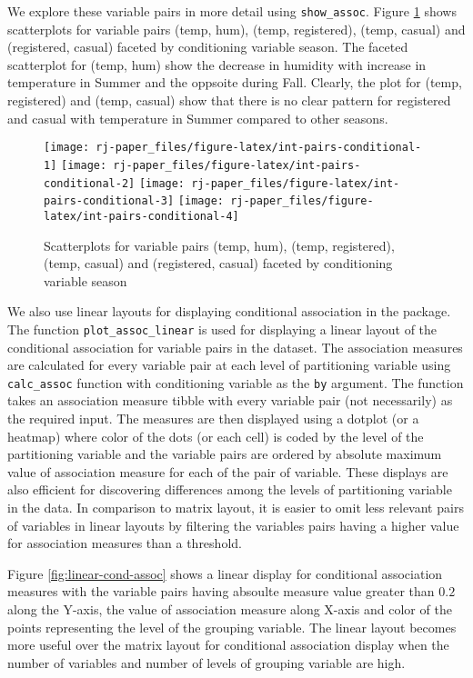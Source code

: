 We explore these variable pairs in more detail using \texttt{show\_assoc}. Figure \ref{fig:int-pairs-conditional} shows scatterplots for variable pairs (temp, hum), (temp, registered), (temp, casual) and (registered, casual) faceted by conditioning variable season. The faceted scatterplot for (temp, hum) show the decrease in humidity with increase in temperature in Summer and the oppsoite during Fall. Clearly, the plot for (temp, registered) and (temp, casual) show that there is no clear pattern for registered and casual with temperature in Summer compared to other seasons.

\begin{figure}
\texttt{[image: rj-paper\_files/figure-latex/int-pairs-conditional-1]} \texttt{[image: rj-paper\_files/figure-latex/int-pairs-conditional-2]} \texttt{[image: rj-paper\_files/figure-latex/int-pairs-conditional-3]} \texttt{[image: rj-paper\_files/figure-latex/int-pairs-conditional-4]} \caption{Scatterplots for variable pairs (temp, hum), (temp, registered), (temp, casual) and (registered, casual) faceted by conditioning variable season}\label{fig:int-pairs-conditional}
\end{figure}

We also use linear layouts for displaying conditional association in the package. The function \texttt{plot\_assoc\_linear} is used for displaying a linear layout of the conditional association for variable pairs in the dataset. The association measures are calculated for every variable pair at each level of partitioning variable using \texttt{calc\_assoc} function with conditioning variable as the \texttt{by} argument. The function takes an association measure tibble with every variable pair (not necessarily) as the required input. The measures are then displayed using a dotplot (or a heatmap) where color of the dots (or each cell) is coded by the level of the partitioning variable and the variable pairs are ordered by absolute maximum value of association measure for each of the pair of variable. These displays are also efficient for discovering differences among the levels of partitioning variable in the data. In comparison to matrix layout, it is easier to omit less relevant pairs of variables in linear layouts by filtering the variables pairs having a higher value for association measures than a threshold.

Figure \ref{fig:linear-cond-assoc} shows a linear display for conditional association measures with the variable pairs having absoulte measure value greater than \(0.2\) along the Y-axis, the value of association measure along X-axis and color of the points representing the level of the grouping variable. The linear layout becomes more useful over the matrix layout for conditional association display when the number of variables and number of levels of grouping variable are high.


